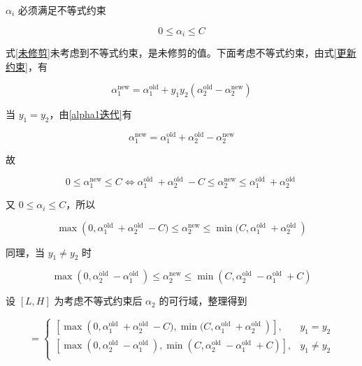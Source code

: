 \documentclass{ctexart}
\begin{document}
	$\alpha_{i}$ 必须满足不等式约束
	
	\begin{equation}
		0\leqslant\alpha_{i}\leqslant C
	\end{equation}

	式\eqref{未修剪}未考虑到不等式约束，是未修剪的值。下面考虑不等式约束，由式\eqref{更新约束}，有
	
	\begin{equation}
		\alpha_{1}^\text{new}=\alpha_{1}^\text{old}+y_1y_2(\alpha_{2}^\text{old}-\alpha_{2}^\text{new})
		\label{alpha1迭代}
	\end{equation}

	当 $y_1=y_2$，由\eqref{alpha1迭代}有
	
	\begin{equation}
		\alpha_{1}^\text{new}=\alpha_{1}^\text{old}+\alpha_{2}^\text{old}-\alpha_{2}^\text{new}
	\end{equation}

	故
	
	\begin{equation}
		0 \leqslant \alpha_{1}^\text{new} \leqslant C \Leftrightarrow \alpha_{1}^{\text {old }}+\alpha_{2}^{\text {old }}-C \leqslant \alpha_{2}^\text{new} \leqslant \alpha_{1}^{\text {old }}+\alpha_{2}^{\text {old }}
	\end{equation}

	又 $0\leqslant \alpha_{i}\leqslant C$，所以
	
	\begin{equation}
		\max\left(0,\alpha_{1}^{\text {old }}+\alpha_{2}^{\text {old }}-C) \leqslant \alpha_{2}^\text{new}\leqslant\min(C,\alpha_{1}^{\text {old }}+\alpha_{2}^{\text {old }}\right)
	\end{equation}

	同理，当 $y_1\neq y_2$ 时
	
	\begin{equation}
		 \max\left(0,\alpha_{2}^{\text {old }}-\alpha_{1}^{\text {old }}\right)\leqslant \alpha_{2}^\text{new} \leqslant \min\left(C,\alpha_{2}^{\text {old }}-\alpha_{1}^{\text {old }}+C\right)
	\end{equation}

	设 $[L,H]$ 为考虑不等式约束后 $\alpha_2$ 的可行域，整理得到
	
	\begin{equation}
		[L,H]=\left\{\begin{matrix}
			\left[\max\left(0,\alpha_{1}^{\text {old }}+\alpha_{2}^{\text {old }}-C),\min(C,\alpha_{1}^{\text {old }}+\alpha_{2}^{\text {old }}\right)\right],&y_1=y_2\\
			\left[\max\left(0,\alpha_{2}^{\text {old }}-\alpha_{1}^{\text {old }}\right),\min\left(C,\alpha_{2}^{\text {old }}-\alpha_{1}^{\text {old }}+C\right)\right],&y_1\neq y_2\\
		\end{matrix}\right.
		\label{alpha2可行域}
	\end{equation}
	
\end{document}
